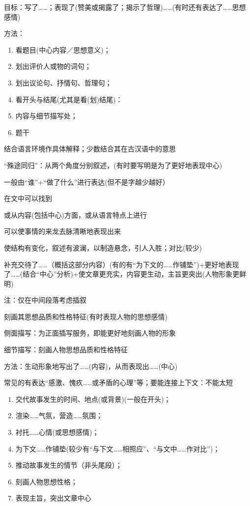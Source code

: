 目标：写了\ldots{}\ldots{}；表现了(赞美或揭露了；揭示了哲理)\ldots{}\ldots{}(有时还有表达了\ldots{}\ldots{}思想感情)

方法：\begin{enumerate}\item 看题目(中心内容／思想意义)；
        \item 划出评价人或物的词句；
        \item 划出议论句、抒情句、哲理句；
        \item 看开头与结尾(尤其是看(划)结尾)：
        \item 内容与细节描写处；
        \item 题干
\end{enumerate}

结合语言环境作具体解释；少数结合其在古汉语中的意思

``殊途同归''：从两个角度分别叙述，(有时要写明是为了更好地表现中心)

一般由``谁''+``做了什么''进行表达(但不是字越少越好）

在文中可以找到

或从内容(包括中心)方面，或从语言特点上进行

可以使事情的来龙去脉清晰地表现出来

使结构有变化，叙述有波澜，以制造悬念，引人入胜；对比(较少)

补充交待了\ldots{}\ldots{}（概括这部分内容）(有的有``为下文的\ldots{}\ldots{}作铺垫'')+更好地表现了\ldots{}\ldots{}(结合``中心''分析)+使文章更充实，内容更生动，主旨更突出(人物形象更鲜明)

注：仅在中间段落考虑插叙

刻画其思想品质和性格特征(有时表现人物的思想感情)

侧面描写：为正面插写服务，即能更好地刻画人物的形象

细节描写：刻画人物思想品质和性格特征

方法：生动形象地写出了\ldots{}\ldots{}(内容)，从而表现出\ldots{}\ldots{}(中心)

常见的有表达``感激、愧疚\ldots{}\ldots{}或矛盾的心理''等；要能连接上下文：不能太短

\begin{enumerate}
\item 交代故事发生的时间、地点(或背景)(一般在开头)；
\item 渲染\ldots{}\ldots{}气氛，营造\ldots{}\ldots{}氛围；
\item 衬托\ldots{}\ldots{}心情(或思想感情)；
\item 为下文\ldots{}\ldots{}作铺垫(较少有``与下文\ldots{}\ldots{}相照应''、``与文中\ldots{}\ldots{}作对比'')；
\item 推动故事发生的情节（非头尾段）；
\item 刻画人物思想性格；
\item 表现主旨，突出文章中心
\end{enumerate}


